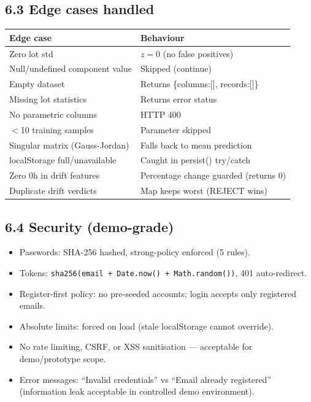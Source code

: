 \documentclass[11pt,a4paper]{article}
\newcommand{\code}[1]{\texttt{\small #1}}
\begin{document}
\subsection*{6.3 Edge cases handled}
\begin{center}
\begin{tabular}{@{}ll@{}}
\toprule
\textbf{Edge case} & \textbf{Behaviour}\\
\midrule
Zero lot std & $z=0$ (no false positives)\\
Null/undefined component value & Skipped (continue)\\
Empty dataset & Returns \{columns:[], records:[]\}\\
Missing lot statistics & Returns error status\\
No parametric columns & HTTP 400\\
$<$10 training samples & Parameter skipped\\
Singular matrix (Gauss-Jordan) & Falls back to mean prediction\\
localStorage full/unavailable & Caught in persist() try/catch\\
Zero 0h in drift features & Percentage change guarded (returns 0)\\
Duplicate drift verdicts & Map keeps worst (REJECT wins)\\
\bottomrule
\end{tabular}
\end{center}

\subsection*{6.4 Security (demo-grade)}
\begin{itemize}[leftmargin=1.5em]
  \item Passwords: SHA-256 hashed, strong-policy enforced (5 rules).
  \item Tokens: \code{sha256(email + Date.now() + Math.random())}, 401 auto-redirect.
  \item Register-first policy: no pre-seeded accounts; login accepts only registered emails.
  \item Absolute limits: forced on load (stale localStorage cannot override).
  \item No rate limiting, CSRF, or XSS sanitisation --- acceptable for demo/prototype scope.
  \item Error messages: ``Invalid credentials'' vs ``Email already registered'' (information leak
        acceptable in controlled demo environment).
\end{itemize}
\end{document}
